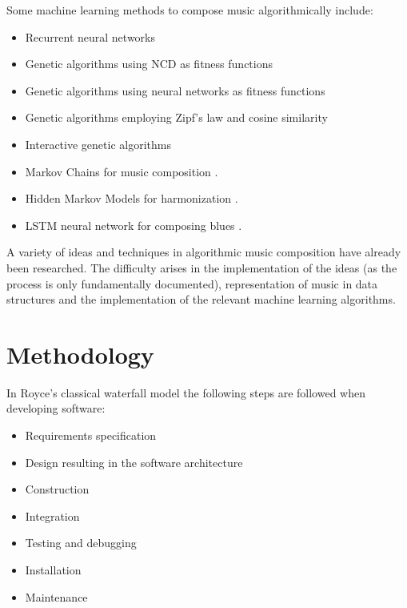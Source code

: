 Some machine learning methods to compose music algorithmically include:
\begin{itemize}
\item Recurrent neural networks \cite{Eck2002, mozer1994neural,Chen2001}
\item Genetic algorithms using \acs{NCD} as fitness functions \cite{Alfonseca2006,Dostal2013}
\item Genetic algorithms using neural networks as fitness functions \cite{gibson1991neurogen,Biles1996,Burton97geneticalgorithm}
\item Genetic algorithms employing Zipf's law and cosine similarity \cite{Dostal2013,Manaris2007,Manaris2005}
\item Interactive genetic algorithms \cite{Biles1994, Biles1996,Unehara,Spector_inductionand,Johanson1998}
\item Markov Chains for music composition \cite{McAlpine1999, Farbood2001}.
\item Hidden Markov Models for harmonization \cite{Allan2004}.
\item LSTM neural network for composing blues \cite{Eck2002}.
\end{itemize}

A variety of ideas and techniques in algorithmic music composition have already been researched. The difficulty arises in the implementation of the ideas (as the process is only fundamentally documented), representation of music in data structures and the implementation of the relevant machine learning algorithms.

\section{Methodology}
In Royce's classical waterfall model the following steps are followed when developing software:
\begin{itemize}
\item Requirements specification
\item Design resulting in the software architecture
\item Construction
\item Integration
\item Testing and debugging
\item Installation
\item Maintenance
\end{itemize}

